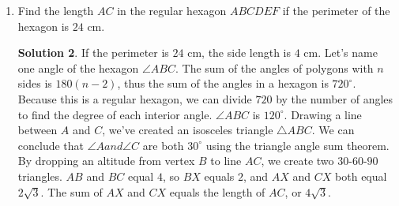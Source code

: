 \documentclass{article}
\theoremstyle{definition}
\newtheorem*{solution}{Solution}
\begin{document}
\begin{multicols}{2}
\begin{enumerate}
\begin{solution}
                Since the triangle is isosceles, the altitude $AX$ to side $BC$ bisects $BC$.
                Thus, from the Pythagorean Theorem on the right triangle $ABX$, we find $AX = 30$, so $ABC = \frac{BC \cdot AX}{2} = \frac{80 \cdot 30}{2} = 1200$ squared units.
            \end{solution}
        \item Find the length $AC$ in the regular hexagon $ABCDEF$ if the perimeter of the hexagon is $24$ cm.
            \begin{solution}
                If the perimeter is $24$ cm, the side length is $4$ cm.
                Let's name one angle of the hexagon $\angle ABC$.
                The sum of the angles of polygons with $n$ sides is $180(n - 2)$, thus the sum of the angles in a hexagon is $720^{\circ}$.
                Because this is a regular hexagon, we can divide $720$ by the number of angles to find the degree of each interior angle.
                $\angle ABC$ is $120^{\circ}$.
                Drawing a line between $A$ and $C$, we've created an isosceles triangle $\triangle ABC$.
                We can conclude that $\angle A and \angle C$ are both $30^{\circ}$ using the triangle angle sum theorem.
                By dropping an altitude from vertex $B$ to line $AC$, we create two $30$-$60$-$90$ triangles.
                $AB$ and $BC$ equal $4$, so $BX$ equals $2$, and $AX$ and $CX$ both equal $2\sqrt{3}$.
                The sum of $AX$ and $CX$ equals the length of $AC$, or $4\sqrt{3}$.
            \end{solution}
    \end{enumerate}
\end{multicols}
\end{document}
